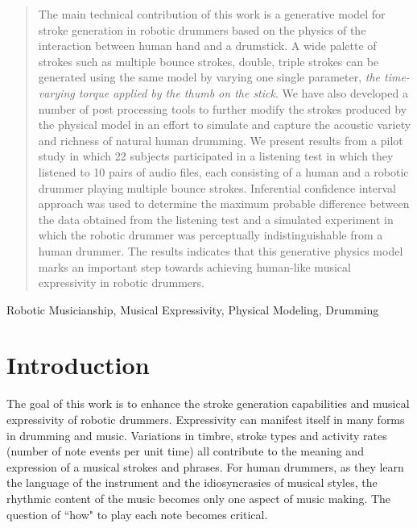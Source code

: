 \documentclass[final,1p,times]{elsarticle}
\begin{document}
\begin{frontmatter}
\begin{abstract}
	The main technical contribution of this work is a generative model for stroke generation in robotic drummers based on the physics of the interaction between human hand and a drumstick. A wide palette of strokes such as multiple bounce strokes, double, triple strokes can be generated using the same model by varying one single parameter, \textit{the time-varying torque applied by the thumb on the stick}. We have also developed a number of post processing tools to further modify the strokes produced by the physical model in an effort to simulate and capture the acoustic variety and richness of natural human drumming.
	We present results from a pilot study in which 22 subjects participated in a listening test in which they listened to 10 pairs of audio files, each consisting of a human and a robotic drummer playing multiple bounce strokes. Inferential confidence interval approach was used to determine the maximum probable difference between the data obtained from the listening test and a simulated experiment in which the robotic drummer was perceptually indistinguishable from a human drummer. The results indicates that this generative physics model marks an important step towards achieving human-like musical expressivity in robotic drummers.
\end{abstract}
\begin{keyword}
	Robotic Musicianship, Musical Expressivity, Physical Modeling, Drumming
\end{keyword}
\end{frontmatter}
\section{Introduction}
The goal of this work is to enhance the stroke generation capabilities and
musical expressivity of robotic drummers. Expressivity can manifest itself
in many forms in drumming and music. Variations in timbre, stroke types
and activity rates (number of note events per unit time) all contribute to the meaning and expression of a musical strokes and
phrases. For human drummers, as they learn the language of the instrument
and the idiosyncrasies of musical styles, the rhythmic content of the music becomes only one aspect of music making. The question of ``how" to play each note becomes critical.
\end{document}
